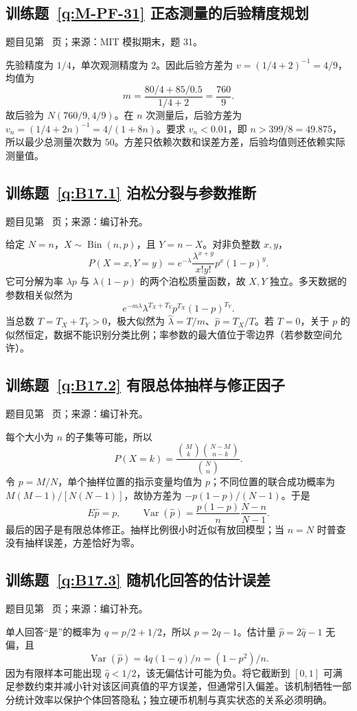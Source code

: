 \subsection*{训练题~\ref{q:M-PF-31} 正态测量的后验精度规划}\label{a:M-PF-31}{\small 题目见第~\pageref{q:M-PF-31} 页；来源：MIT 模拟期末，题 31。}
\begin{solve}先验精度为 $1/4$，单次观测精度为 $2$。因此后验方差为 $v=(1/4+2)^{-1}=4/9$，均值为\[m=\frac{80/4+85/0.5}{1/4+2}=\frac{760}{9}.\]故后验为 $N(760/9,4/9)$。在 $n$ 次测量后，后验方差为 $v_n=(1/4+2n)^{-1}=4/(1+8n)$。要求 $v_n<0.01$，即 $n>399/8=49.875$，所以最少总测量次数为 $50$。方差只依赖次数和误差方差，后验均值则还依赖实际测量值。\end{solve}

\subsection*{训练题~\ref{q:B17.1} 泊松分裂与参数推断}\label{a:B17.1}{\small 题目见第~\pageref{q:B17.1} 页；来源：编订补充。}
\begin{solve}给定 $N=n$，$X\sim\operatorname{Bin}(n,p)$，且 $Y=n-X$。对非负整数 $x,y$，\[P(X=x,Y=y)=e^{-\lambda}\frac{\lambda^{x+y}}{x!y!}p^x(1-p)^y.\]它可分解为率 $\lambda p$ 与 $\lambda(1-p)$ 的两个泊松质量函数，故 $X,Y$ 独立。多天数据的参数相关似然为\[e^{-m\lambda}\lambda^{T_X+T_Y}p^{T_X}(1-p)^{T_Y}.\]当总数 $T=T_X+T_Y>0$，极大似然为 $\widehat\lambda=T/m$、$\widehat p=T_X/T$。若 $T=0$，关于 $p$ 的似然恒定，数据不能识别分类比例；率参数的最大值位于零边界（若参数空间允许）。\end{solve}

\subsection*{训练题~\ref{q:B17.2} 有限总体抽样与修正因子}\label{a:B17.2}{\small 题目见第~\pageref{q:B17.2} 页；来源：编订补充。}
\begin{solve}每个大小为 $n$ 的子集等可能，所以\[P(X=k)=\frac{\binom Mk\binom{N-M}{n-k}}{\binom Nn}.\]令 $p=M/N$，单个抽样位置的指示变量均值为 $p$；不同位置的联合成功概率为 $M(M-1)/[N(N-1)]$，故协方差为 $-p(1-p)/(N-1)$。于是\[E\widehat p=p,\qquad\operatorname{Var}(\widehat p)=\frac{p(1-p)}n\frac{N-n}{N-1}.\]最后的因子是有限总体修正。抽样比例很小时近似有放回模型；当 $n=N$ 时普查没有抽样误差，方差恰好为零。\end{solve}

\subsection*{训练题~\ref{q:B17.3} 随机化回答的估计误差}\label{a:B17.3}{\small 题目见第~\pageref{q:B17.3} 页；来源：编订补充。}
\begin{solve}单人回答“是”的概率为 $q=p/2+1/2$，所以 $p=2q-1$。估计量 $\widehat p=2\widehat q-1$ 无偏，且\[\operatorname{Var}(\widehat p)=4q(1-q)/n=(1-p^2)/n.\]因为有限样本可能出现 $\widehat q<1/2$，该无偏估计可能为负。将它截断到 $[0,1]$ 可满足参数约束并减小针对该区间真值的平方误差，但通常引入偏差。该机制牺牲一部分统计效率以保护个体回答隐私；独立硬币机制与真实状态的关系必须明确。\end{solve}

